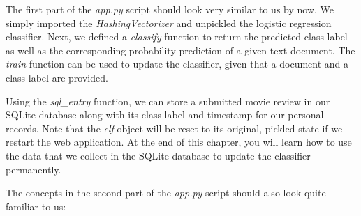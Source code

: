 \documentclass[11pt]{article}
\begin{document}
    The first part of the \emph{app.py} script should look very similar to
us by now. We simply imported the \emph{HashingVectorizer} and unpickled
the logistic regression classifier. Next, we defined a \emph{classify}
function to return the predicted class label as well as the
corresponding probability prediction of a given text document. The
\emph{train} function can be used to update the classifier, given that a
document and a class label are provided.

Using the \emph{sql\_entry} function, we can store a submitted movie
review in our SQLite database along with its class label and timestamp
for our personal records. Note that the \emph{clf} object will be reset
to its original, pickled state if we restart the web application. At the
end of this chapter, you will learn how to use the data that we collect
in the SQLite database to update the classifier permanently.

The concepts in the second part of the \emph{app.py} script should also
look quite familiar to us:
\end{document}
